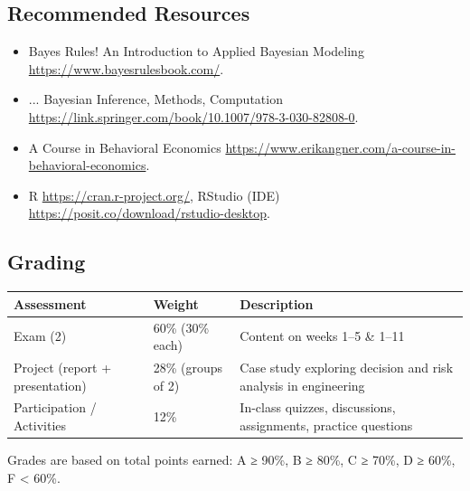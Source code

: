 \documentclass[11pt]{article}
\renewcommand{\arraystretch}{.9}
\begin{document}
\subsection*{Recommended Resources}
\begin{itemize}[leftmargin=*,nosep]
\item {Bayes Rules! An Introduction to Applied Bayesian Modeling} \url{https://www.bayesrulesbook.com/}.
\item {... Bayesian Inference, Methods, Computation} \mbox{\url{https://link.springer.com/book/10.1007/978-3-030-82808-0}}.
\item {A Course in Behavioral Economics} \mbox{\url{https://www.erikangner.com/a-course-in-behavioral-economics}.}
\item R \url{https://cran.r-project.org/}, RStudio (IDE) \url{https://posit.co/download/rstudio-desktop}.
\end{itemize}

\subsection*{Grading}
\renewcommand{\arraystretch}{1.025}
\begin{tabular}{l l l}
\hline
\textbf{Assessment}             & \textbf{Weight}    & \textbf{Description} \\
\hline
Exam (2)                        & 60\% (30\% each)   & Content on weeks 1--5 \& 1--11 \\
Project (report + presentation) & 28\% (groups of 2) & Case study exploring decision and risk analysis in engineering \\
Participation / Activities      & 12\%               & In-class quizzes, discussions, assignments, practice questions \\
\hline
\end{tabular}

\vspace{0pt}

{\footnotesize
\renewcommand{\arraystretch}{.9}
Grades are based on total points earned: A ≥ 90\%, B ≥ 80\%, C ≥ 70\%, D ≥ 60\%, F < 60\%.
}
\end{document}
